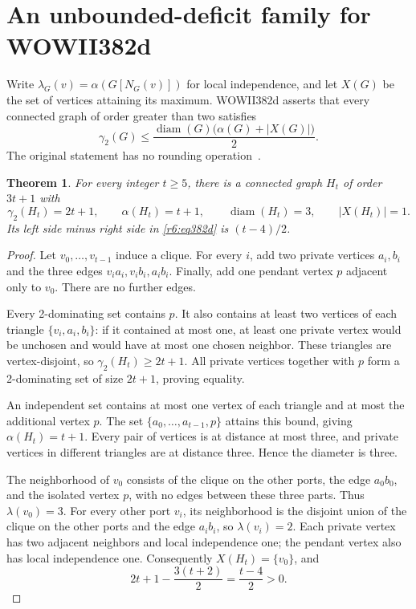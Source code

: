 \documentclass[11pt,a4paper]{article}
\newtheorem{theorem}{Theorem}[section]
\theoremstyle{remark}
\begin{document}
\section{An unbounded-deficit family for WOWII382d}
\label{r6:sec382d}

Write $\lambda_G(v)=\alpha(G[N_G(v)])$ for local independence, and
let $X(G)$ be the set of vertices attaining its maximum. WOWII382d
asserts that every connected graph of order greater than two satisfies
\begin{equation}\label{r6:eq382d}
 \gamma_2(G)\le
 \frac{\operatorname{diam}(G)\bigl(\alpha(G)+|X(G)|\bigr)}{2}.
\end{equation}
The original statement has no rounding operation~\cite{WOWII}.

\begin{theorem}\label{r6:family382d}
For every integer $t\ge5$, there is a connected graph $H_t$ of order
$3t+1$ with
\[
 \gamma_2(H_t)=2t+1,\qquad
 \alpha(H_t)=t+1,\qquad
 \operatorname{diam}(H_t)=3,\qquad |X(H_t)|=1.
\]
Its left side minus right side in \eqref{r6:eq382d} is $(t-4)/2$.
\end{theorem}
\begin{proof}
Let $v_0,\ldots,v_{t-1}$ induce a clique. For every $i$, add two
private vertices $a_i,b_i$ and the three edges
$v_ia_i,v_ib_i,a_ib_i$. Finally, add one pendant vertex $p$ adjacent
only to $v_0$. There are no further edges.

Every 2-dominating set contains $p$. It also contains at least two
vertices of each triangle $\{v_i,a_i,b_i\}$: if it contained at most
one, at least one private vertex would be unchosen and would have at
most one chosen neighbor. These triangles are vertex-disjoint, so
$\gamma_2(H_t)\ge2t+1$. All private vertices together with $p$ form
a 2-dominating set of size $2t+1$, proving equality.

An independent set contains at most one vertex of each triangle and
at most the additional vertex $p$. The set
$\{a_0,\ldots,a_{t-1},p\}$ attains this bound, giving
$\alpha(H_t)=t+1$. Every pair of vertices is at distance at most
three, and private vertices in different triangles are at distance
three. Hence the diameter is three.

The neighborhood of $v_0$ consists of the clique on the other ports,
the edge $a_0b_0$, and the isolated vertex $p$, with no edges between
these three parts. Thus $\lambda(v_0)=3$. For every other port $v_i$,
its neighborhood is the disjoint union of the clique on the other
ports and the edge $a_ib_i$, so $\lambda(v_i)=2$. Each private
vertex has two adjacent neighbors and local independence one; the
pendant vertex also has local independence one. Consequently
$X(H_t)=\{v_0\}$, and
\[
 2t+1-\frac{3(t+2)}{2}=\frac{t-4}{2}>0.
\]
\end{proof}
\end{document}
